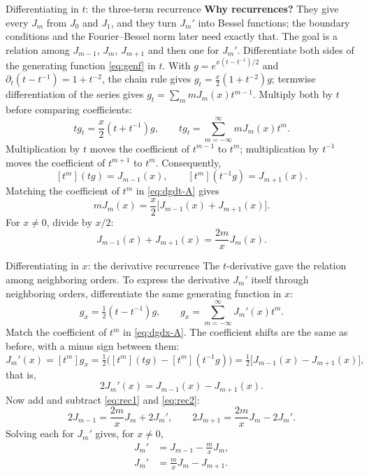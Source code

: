 \documentclass[11pt]{beamer}
\begin{document}
\begin{frame}[allowframebreaks=1.00]{Differentiating in $t$: the three-term recurrence}
\footnotesize
\textbf{Why recurrences?} They give every $J_m$ from $J_0$ and $J_1$, and they turn
$J_m'$ into Bessel functions; the boundary conditions and the Fourier--Bessel norm later
need exactly that.
The goal is a relation among $J_{m-1}$, $J_m$, $J_{m+1}$ and then one for $J_m'$.
Differentiate both sides of the generating function \eqref{eq:genf} in $t$. With $g=e^{x(t-t^{-1})/2}$ and
$\partial_t(t-t^{-1})=1+t^{-2}$, the chain rule gives $g_t=\frac x2(1+t^{-2})g$; termwise differentiation
of the series gives $g_t=\sum_m mJ_m(x)t^{m-1}$. Multiply both by $t$ before comparing coefficients:
\begin{equation}
 tg_t=\frac x2(t+t^{-1})g,
 \qquad tg_t=\sum_{m=-\infty}^{\infty}mJ_m(x)t^m.
 \label{eq:dgdt-A}
\end{equation}
Multiplication by $t$ moves the coefficient of $t^{m-1}$ to $t^m$; multiplication by
$t^{-1}$ moves the coefficient of $t^{m+1}$ to $t^m$. Consequently,
\[
 [t^m](tg)=J_{m-1}(x),\qquad [t^m](t^{-1}g)=J_{m+1}(x).
\]
Matching the coefficient of $t^m$ in \eqref{eq:dgdt-A} gives
\[
 mJ_m(x)=\frac x2\bigl[J_{m-1}(x)+J_{m+1}(x)\bigr].
\]
For $x\ne0$, divide by $x/2$:
\begin{equation}
 J_{m-1}(x)+J_{m+1}(x)=\frac{2m}{x}J_m(x).
 \label{eq:rec1}
\end{equation}
\end{frame}

\begin{frame}[allowframebreaks=1.00]{Differentiating in $x$: the derivative recurrence}
\footnotesize
The $t$-derivative gave the relation among neighboring orders. To express the derivative $J_m'$
itself through neighboring orders, differentiate the same generating function in $x$:
\begin{equation}
 g_x=\tfrac12(t-t^{-1})g,
 \qquad g_x=\sum_{m=-\infty}^{\infty}J_m'(x)t^m.
 \label{eq:dgdx-A}
\end{equation}
Match the coefficient of $t^m$ in \eqref{eq:dgdx-A}. The coefficient shifts are the same as before, with a minus sign between them:
\[
 J_m'(x)=[t^m]g_x=\tfrac12\bigl([t^m](tg)-[t^m](t^{-1}g)\bigr)
 =\tfrac12\bigl[J_{m-1}(x)-J_{m+1}(x)\bigr],
\]
that is,
\begin{equation}
 2J_m'(x)=J_{m-1}(x)-J_{m+1}(x).
 \label{eq:rec2}
\end{equation}
Now add and subtract \eqref{eq:rec1} and \eqref{eq:rec2}:
\[
 2J_{m-1}=\frac{2m}{x}J_m+2J_m',\qquad
 2J_{m+1}=\frac{2m}{x}J_m-2J_m'.
\]
Solving each for $J_m'$ gives, for $x\ne0$,
\begin{align}
 J_m'&=J_{m-1}-\frac m xJ_m,\label{eq:rec-derivative-lower}\\
 J_m'&=\frac m xJ_m-J_{m+1}.\label{eq:rec-derivative-upper}
\end{align}
\end{frame}
\end{document}
